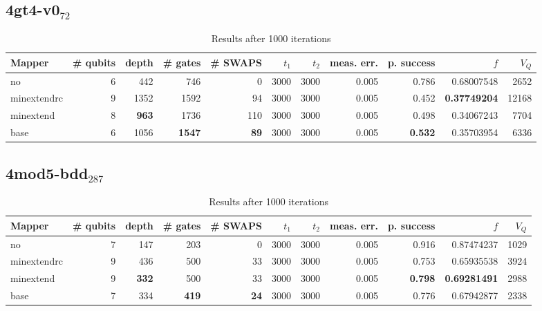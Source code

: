 \documentclass[11pt]{article}
\begin{document}
\subsection{4gt4-v0\(_{\text{72}}\)}
\label{sec:org1dfc6ab}

\begin{table}[!htpb]
\caption{\label{tab:org0260211}
Results after 1000 iterations}
\centering
\begin{tabular}{lrrrrrrrrrr}
\hline
Mapper & \# qubits & depth & \# gates & \# SWAPS & \(t_1\) & \(t_2\) & meas. err. & p. success & \(f\) & \(V_Q\)\\
\hline
no & 6 & 442 & 746 & 0 & 3000 & 3000 & 0.005 & 0.786 & 0.68007548 & 2652\\
\hline
minextendrc & 9 & 1352 & 1592 & 94 & 3000 & 3000 & 0.005 & 0.452 & \textbf{0.37749204} & 12168\\
minextend & 8 & \textbf{963} & 1736 & 110 & 3000 & 3000 & 0.005 & 0.498 & 0.34067243 & 7704\\
base & 6 & 1056 & \textbf{1547} & \textbf{89} & 3000 & 3000 & 0.005 & \textbf{0.532} & 0.35703954 & 6336\\
\hline
\end{tabular}
\end{table}

\subsection{4mod5-bdd\(_{\text{287}}\)}
\label{sec:orgba66a1d}
\begin{table}[!htpb]
\caption{\label{tab:org2bc7f4a}
Results after 1000 iterations}
\centering
\begin{tabular}{lrrrrrrrrrr}
\hline
Mapper & \# qubits & depth & \# gates & \# SWAPS & \(t_1\) & \(t_2\) & meas. err. & p. success & \(f\) & \(V_Q\)\\
\hline
no & 7 & 147 & 203 & 0 & 3000 & 3000 & 0.005 & 0.916 & 0.87474237 & 1029\\
\hline
minextendrc & 9 & 436 & 500 & 33 & 3000 & 3000 & 0.005 & 0.753 & 0.65935538 & 3924\\
minextend & 9 & \textbf{332} & 500 & 33 & 3000 & 3000 & 0.005 & \textbf{0.798} & \textbf{0.69281491} & 2988\\
base & 7 & 334 & \textbf{419} & \textbf{24} & 3000 & 3000 & 0.005 & 0.776 & 0.67942877 & 2338\\
\hline
\end{tabular}
\end{table}
\end{document}
